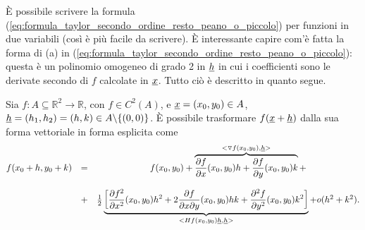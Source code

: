 È possibile scrivere la formula (\ref{eq:formula_taylor_secondo_ordine_resto_peano_o_piccolo}) per funzioni in due variabili (così è più facile da scrivere). È interessante capire com'è fatta la forma di (a) in (\ref{eq:formula_taylor_secondo_ordine_resto_peano_o_piccolo}): questa è un polinomio omogeneo di grado 2 in $\uline h$ in cui i coefficienti sono le derivate secondo di $f$ calcolate in $\uline x$. Tutto ciò è descritto in quanto segue.

Sia $f: A\subseteq\mathbb{R}^2\rightarrow\mathbb{R}$, con $f\in C^2(A)$, e $\uline x=(x_0,y_0)\in A$, $\uline h = (h_1, h_2) = (h, k)\in A\backslash\{(0,0)\}$. È possibile trasformare $f(\uline x+ \uline h)$ dalla sua forma vettoriale in forma esplicita come
\begin{equation}\label{eq:esempio_forma_taylor_secondo_ordine_resto_peano}
	\begin{matrix}
		f(x_0 + h, y_0 + k) &=& f(x_0, y_0) + \overbrace{\frac{\partial f}{\partial x} (x_0,y_0) h + \frac{\partial f}{\partial y} (x_0,y_0) k}^{<\triangledown f(x_0,y_0),\uline h>} + \\\\
		&+& \frac{1}{2} \underbrace{\left[\frac{\partial f^2}{\partial x^2} (x_0,y_0) h^2 + 2\frac{\partial f}{\partial x\partial y} (x_0,y_0)hk + \frac{\partial^2 f}{\partial y^2} (x_0,y_0)k^2\right]}_{<Hf(x_0,y_0)\uline h, \uline h>} + o(h^2+k^2).
	\end{matrix}
\end{equation}

